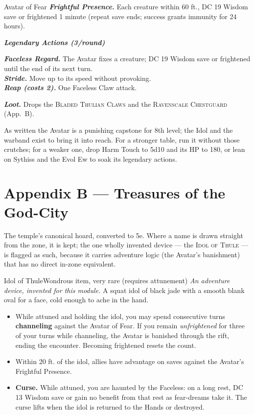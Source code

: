 \documentclass[10pt,twoside]{article}
\newcommand{\sbrule}{\par\vspace{2pt}\noindent{\color{bloodred}\rule{\linewidth}{1.1pt}}\par\vspace{2pt}}
\newcommand{\eqname}[1]{\textsc{#1}}
\begin{document}
\begin{statblock}{Avatar of Fear}
\textbf{\textit{Frightful Presence.}} Each creature within 60 ft., DC 19 Wisdom save
or frightened 1 minute (repeat save ends; success grants immunity for 24 hours).\sbrule
\textit{\textbf{Legendary Actions (3/round)}}\par
\textbf{\textit{Faceless Regard.}} The Avatar fixes a creature; DC 19 Wisdom save or
frightened until the end of its next turn.\\
\textbf{\textit{Stride.}} Move up to its speed without provoking.\\
\textbf{\textit{Reap (costs 2).}} One Faceless Claw attack.\sbrule
\textbf{\textit{Loot.}} Drops the \eqname{Bladed Thulian Claws} and the
\eqname{Ravenscale Chestguard} (App.\ B).
\end{statblock}

\begin{dmnote}
As written the Avatar is a punishing capstone for 8th level; the Idol and the warband
exist to bring it into reach. For a stronger table, run it without those crutches; for
a weaker one, drop Harm Touch to 5d10 and its HP to 180, or lean on Sythiss and the
Evol Ew to soak its legendary actions.
\end{dmnote}
\clearpage
\section{Appendix B --- Treasures of the God-City}

The temple's canonical hoard, converted to 5e. Where a name is drawn straight from
the zone, it is kept; the one wholly invented device --- the \eqname{Idol of Thule} ---
is flagged as such, because it carries adventure logic (the Avatar's banishment) that
has no direct in-zone equivalent.

\begin{itemcard}{Idol of Thule}{Wondrous item, very rare (requires attunement)}
\emph{An adventure device, invented for this module.} A squat idol of black jade with
a smooth blank oval for a face, cold enough to ache in the hand.
\begin{itemize}
\item While attuned and holding the idol, you may spend consecutive turns
\textbf{channeling} against the Avatar of Fear. If you remain \emph{unfrightened} for
three of your turns while channeling, the Avatar is banished through the rift, ending
the encounter. Becoming frightened resets the count.
\item Within 20 ft. of the idol, allies have advantage on saves against the Avatar's
Frightful Presence.
\item \textbf{Curse.} While attuned, you are haunted by the Faceless: on a long rest,
DC 13 Wisdom save or gain no benefit from that rest as fear-dreams take it. The curse
lifts when the idol is returned to the Hands or destroyed.
\end{itemize}
\end{itemcard}
\end{document}

